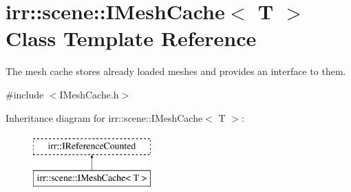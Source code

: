 \hypertarget{classirr_1_1scene_1_1IMeshCache}{}\section{irr\+:\+:scene\+:\+:I\+Mesh\+Cache$<$ T $>$ Class Template Reference}
\label{classirr_1_1scene_1_1IMeshCache}


The mesh cache stores already loaded meshes and provides an interface to them.  




{\ttfamily \#include $<$I\+Mesh\+Cache.\+h$>$}

Inheritance diagram for irr\+:\+:scene\+:\+:I\+Mesh\+Cache$<$ T $>$\+:\begin{figure}[H]
\begin{center}
\leavevmode
\includegraphics[height=2.000000cm]{classirr_1_1scene_1_1IMeshCache}
\end{center}
\end{figure}
